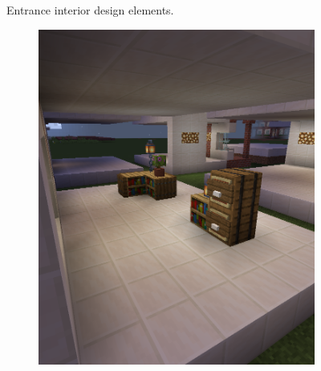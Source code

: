 \documentclass[
oneside,
fontsize=11pt
]{scrartcl}
\begin{document}
\begin{figure}[ht]
  \caption{Entrance interior design elements.}
  \label{fig_interior_design_entrance}
\end{figure}

\begin{figure}[ht]
  \centering
  \begin{subfigure}[t]{0.3\textwidth}
    \includegraphics[width=\textwidth]{images/interior/middle-decoration-bookshelfs.png}
  \end{subfigure}
  \hfill
  \begin{subfigure}[t]{0.3\textwidth}

\end{subfigure}
\end{figure}
\end{document}
